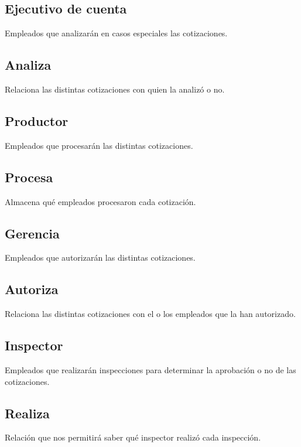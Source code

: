 \documentclass[a4paper,11pt]{article}
\begin{document}
\subsection{Ejecutivo de cuenta}

Empleados que analizarán en casos especiales las cotizaciones.

\subsection{Analiza}

Relaciona las distintas cotizaciones con quien la analizó o no.

\subsection{Productor}

Empleados que procesarán las distintas cotizaciones.

\subsection{Procesa}

Almacena qué empleados procesaron cada cotización.

\subsection{Gerencia}

Empleados que autorizarán las distintas cotizaciones.

\subsection{Autoriza}

Relaciona las distintas cotizaciones con el o los empleados que la han autorizado.

\subsection{Inspector}

Empleados que realizarán inspecciones para determinar 
la aprobación o no de las cotizaciones.

\subsection{Realiza}

Relación que nos permitirá saber qué inspector realizó cada inspección.
\end{document}
